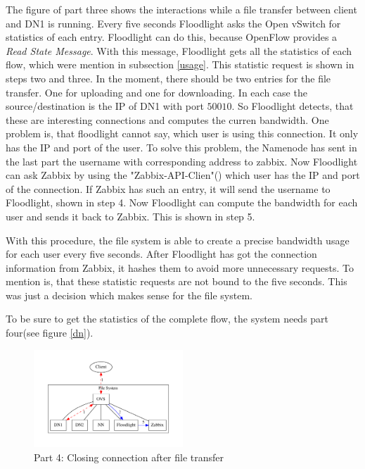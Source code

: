 The figure of part three shows the interactions while a file transfer between client and DN1 is running. Every five seconds Floodlight asks the Open vSwitch for statistics of each entry. Floodlight can do this, because OpenFlow provides a \textit{Read State Message}\cite[p. 30]{ofspec}. With this message, Floodlight gets all the statistics of each flow, which were mention in subsection \ref{usage}. This statistic request is shown in steps two and three. In the moment, there should be two entries for the file transfer. One for uploading and one for downloading. In each case the source/destination is the IP of DN1 with port $50010$. So Floodlight detects, that these are interesting connections and computes the curren bandwidth. One problem is, that floodlight cannot say, which user is using this connection. It only has the IP and port of the user. To solve this problem, the Namenode has sent in the last part the username with corresponding address to zabbix. Now Floodlight can ask Zabbix by using the "Zabbix-API-Clien"() which user has the IP and port of the connection. If Zabbix has such an entry, it will send the username to Floodlight, shown in step 4. Now Floodlight can compute the bandwidth for each user and sends it back to Zabbix. This is shown in step 5.

With this procedure, the file system is able to create a precise bandwidth usage for each user every five seconds. After Floodlight has got the connection information from Zabbix, it hashes them to avoid more unnecessary requests. To mention is, that these statistic requests are not bound to the five seconds. This was just a decision which makes sense for the file system.

To be sure to get the statistics of the complete flow, the system needs part four(see figure \ref{dn}).  

\begin{figure}[ht]
\centering
\includegraphics[width=0.5\textwidth]{img/closeConnection} 
\caption{Part 4: Closing connection after file transfer}
\label{cc}
\end{figure}

